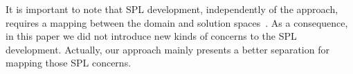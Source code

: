 \documentclass{sig-alt-full}
\begin{document}
It is important to note that SPL development, independently of the approach, requires a
mapping between the domain and solution spaces~\cite{Czarnecki:2000aa,Jayaraman:2007aa}. As a
consequence, in this paper we did not introduce new kinds of concerns to the SPL
development. Actually, our approach mainly presents a better separation for
mapping those SPL concerns. 


% 
% 
% 
% 
% 
\end{document}
